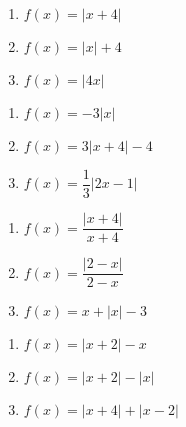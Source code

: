 {\begin{multicols}{3}
\begin{enumerate}
\setcounter{enumi}{\value{HW}}

\item $f(x) = |x + 4|$ \label{graphabsvalexerfirst}
\item $f(x) = |x| + 4$
\item $f(x) = |4x|$


\setcounter{HW}{\value{enumi}}
\end{enumerate}
\end{multicols}

\begin{multicols}{3}
\begin{enumerate}
\setcounter{enumi}{\value{HW}}

\item $f(x) = -3|x|$ 
\item $f(x) = 3|x + 4| - 4$ 
\item $f(x) = \dfrac{1}{3}|2x - 1|$

\setcounter{HW}{\value{enumi}}
\end{enumerate}
\end{multicols}

\begin{multicols}{3}
\begin{enumerate}
\setcounter{enumi}{\value{HW}}

\item $f(x) = \dfrac{|x + 4|}{x + 4}$
\item $f(x) = \dfrac{|2 - x|}{2 - x}$
\item  $f(x) = x + |x| - 3$ 

\setcounter{HW}{\value{enumi}}
\end{enumerate}
\end{multicols}

\begin{multicols}{3}
\begin{enumerate}
\setcounter{enumi}{\value{HW}}

\item  $f(x) = |x+2| - x$
\item  $f(x) = |x+2| - |x|$
\item $f(x) = |x + 4| + |x - 2|$ \label{graphabsvalexerlast}

\setcounter{HW}{\value{enumi}}
\end{enumerate}
\end{multicols}

}
